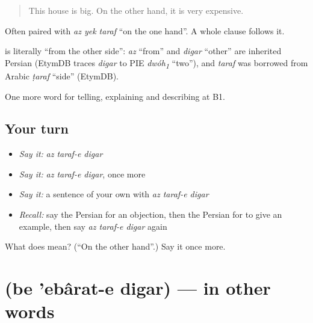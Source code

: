 \begin{quote}
This house is big. On the other hand, it is very expensive.
\end{quote}

Often paired with \emph{az yek taraf} \textquotedblleft{}on the one hand\textquotedblright{}. A whole clause follows it.

\begin{cousinweb}
\textbf{  } is literally \textquotedblleft{}from the other side\textquotedblright{}: \emph{az} \textquotedblleft{}from\textquotedblright{} and \emph{digar} \textquotedblleft{}other\textquotedblright{} are inherited Persian (EtymDB traces \emph{digar} to PIE \emph{dwóh\textsubscript{1}} \textquotedblleft{}two\textquotedblright{}), and \emph{taraf} was borrowed from Arabic \emph{ṭaraf} \textquotedblleft{}side\textquotedblright{} (EtymDB).
\end{cousinweb}

\begin{grammarlens}[title={What you've built}]
One more word for telling, explaining and describing at B1.
\end{grammarlens}

\subsection*{Your turn}
\begin{itemize}
\raggedright
  \item \emph{Say it:} \emph{az taraf-e digar}
  \item \emph{Say it:} \emph{az taraf-e digar}, once more
  \item \emph{Say it:} a sentence of your own with \emph{az taraf-e digar}
  \item \emph{Recall:} say the Persian for an objection, then the Persian for to give an example, then say \emph{az taraf-e digar} again
\end{itemize}

\begin{tcolorbox}[breakable,colback=teal!4,colframe=teal!35!black,title={Before you move on}]
What does    mean? (\textquotedblleft{}On the other hand\textquotedblright{}.) Say it once more.
\end{tcolorbox}
\section[\texorpdfstring{\fa{به} \fa{عبارت} \fa{دیگر} (be 'ebârat-e digar)}{به عبارت دیگر (be 'ebârat-e digar)}]{   (be 'ebârat-e digar) — in other words}

